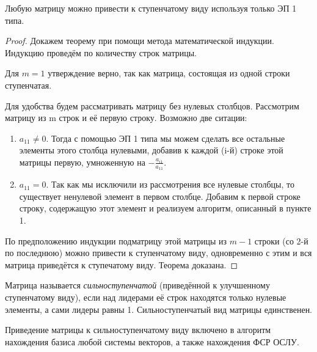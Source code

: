 \begin{theorem}
  Любую матрицу можно привести к ступенчатому виду используя только ЭП 1 типа.
  \label{mat:echelon}
\end{theorem}
  
\begin{proof}
  Докажем теорему при помощи метода математической индукции. Индукцию
  проведём по количеству строк матрицы.
  
  Для $m = 1$ утверждение верно, так как матрица, состоящая из одной строки ступенчатая.
    
  Для удобства будем рассматривать матрицу без нулевых
  столбцов. Рассмотрим матрицу из m строк и её первую строку. Возможно
  две ситации:
  \begin{enumerate}
  \item $a_{11}\ne0$. Тогда с помощью ЭП 1 типа мы можем сделать все остальные элементы этого столбца нулевыми, добавив к каждой (i-й) строке этой матрицы первую, умноженную на $-\frac{a_{i1}}{a_{11}}$. 
  \item $a_{11}=0$. Так как мы исключили из рассмотрения все нулевые столбцы, то существует ненулевой элемент в первом столбце. Добавим к первой строке строку, содержащую этот элемент и реализуем алгоритм, описанный в пункте 1.
  \end{enumerate}
    
    По предположению индукции подматрицу этой матрицы из $m-1$ строки (со 2-й по последнюю) можно привести к ступенчатому виду, одновременно с этим и вся матрица приведётся к ступечатому виду. Теорема доказана.
  \end{proof}
  
  \begin{df}
    Матрица называется \emph{сильноступенчатой} (приведённой к улучшенному ступенчатому виду), если над лидерами её строк находятся только нулевые элементы, а сами лидеры равны 1. Сильноступенчатый вид матрицы единственен.
  \end{df}

Приведение матрицы к сильноступенчатому виду включено в алгоритм нахождения базиса любой системы векторов, а также нахождения ФСР ОСЛУ.
  
  
